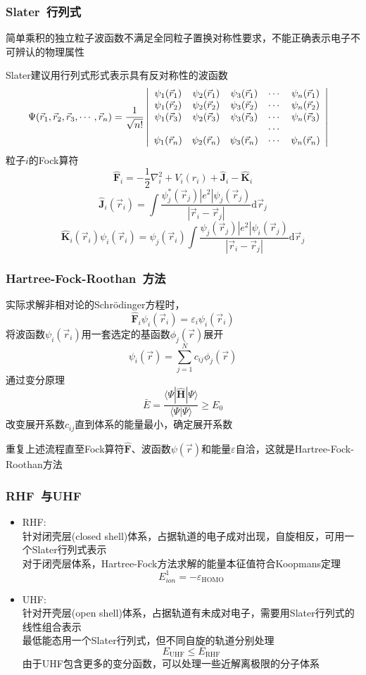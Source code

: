 \documentclass[cjk,slidestop,compress,mathserif,blue]{beamer}
\begin{document}
\frame
{
	\frametitle{\textrm{Slater~}行列式}
	简单乘积的独立粒子波函数不满足全同粒子置换对称性要求，不能正确表示电子不可辨认的物理属性
	
	\textrm{Slater}建议用行列式形式表示具有反对称性的波函数
	\begin{displaymath}
		\hspace*{-10pt}\Psi(\vec r_1,\vec r_2,\vec r_3,\cdots,\vec r_n)=\dfrac1{\sqrt{n!}}
		\left|\begin{array}{ccccc}
			\psi_1(\vec r_1)&\psi_2(\vec r_1)&\psi_3(\vec r_1)&\cdots&\psi_n(\vec r_1)\\
			\psi_1(\vec r_2)&\psi_2(\vec r_2)&\psi_3(\vec r_2)&\cdots&\psi_n(\vec r_2)\\
			\psi_1(\vec r_3)&\psi_2(\vec r_3)&\psi_3(\vec r_3)&\cdots&\psi_n(\vec r_3)\\
			&&&\cdots&\\
			\psi_1(\vec r_n)&\psi_2(\vec r_n)&\psi_3(\vec r_n)&\cdots&\psi_n(\vec r_n)
		\end{array}\right|
	\end{displaymath}
	粒子$i$的\textrm{Fock}算符
	$$\hat{\mathbf F}_i=-\dfrac{1}{2}\nabla_i^2+V_i(r_i)+\hat{\mathbf J}_i-\hat{\mathbf K}_i$$
	$$\hat{\mathbf J}_i(\vec r_i)=\int\dfrac{\psi_j^{\ast}(\vec r_j)|e^2|\psi_j(\vec r_j)}{|\vec r_i-\vec r_j|}\mathrm{d}\vec r_j$$
	$$\hat{\mathbf K}_i(\vec r_i)\psi_i(\vec r_i)=\psi_j(\vec r_i)\int\dfrac{\psi_j(\vec r_j)|e^2|\psi_i(\vec r_j)}{|\vec r_i-\vec r_j|}\mathrm{d}\vec r_j$$

}

\frame
{
	\frametitle{\textrm{Hartree-Fock-Roothan~}方法}
	实际求解非相对论的\textrm{Schr\"odinger}方程时，
	$$\hat{\mathbf F}_i\psi_i(\vec r_i)=\varepsilon_i\psi_i(\vec r_i)$$
	将波函数$\psi_i(\vec r_i)$用一套选定的基函数$\phi_j(\vec r)$展开
	$$\psi_i(\vec r)=\sum_{j=1}^Nc_{ij}\phi_j(\vec r)$$
	通过变分原理
	$$\bar E=\dfrac{\langle\Psi|\hat{\mathbf H}|\Psi\rangle}{\langle\Psi|\Psi\rangle}\geqslant E_0$$
	改变展开系数$c_{ij}$直到体系的能量最小，确定展开系数

	重复上述流程直至\textrm{Fock}算符$\hat{\mathbf F}$、波函数$\psi(\vec r)$和能量$\varepsilon$自洽，这就是\textrm{Hartree-Fock-Roothan}方法
}

\frame
{
	\frametitle{\textrm{RHF~}与\textrm{UHF}} 
	\begin{itemize}
		\item \textrm{RHF}:\\
			针对闭壳层(\textrm{closed shell})体系，占据轨道的电子成对出现，自旋相反，可用一个\textrm{Slater}行列式表示\\
			对于闭壳层体系，\textrm{Hartree-Fock}方法求解的能量本征值符合\textrm{Koopmans}定理
			$$E_{ion}^1=-\varepsilon_{\mathrm{HOMO}}$$
		\item \textrm{UHF}:\\
			针对开壳层(\textrm{open shell})体系，占据轨道有未成对电子，需要用\textrm{Slater}行列式的线性组合表示\\
			最低能态用一个\textrm{Slater}行列式，但不同自旋的轨道分别处理
		$$E_{\mathrm{UHF}}\leqslant E_{\mathrm{RHF}}$$
			由于\textrm{UHF}包含更多的变分函数，可以处理一些近解离极限的分子体系
	\end{itemize}
}
\end{document}
